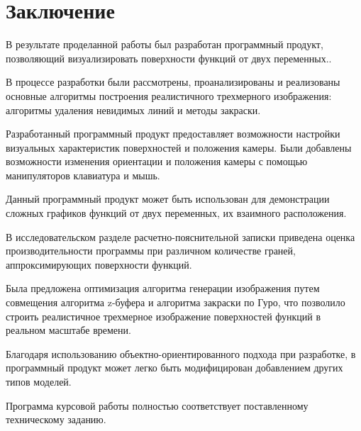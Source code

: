 \chapter*{Заключение}


В результате проделанной работы был разработан программный продукт, позволяющий визуализировать поверхности функций от двух переменных..

В процессе разработки были рассмотрены, проанализированы и реализованы основные алгоритмы построения реалистичного трехмерного изображения: алгоритмы удаления невидимых линий и методы закраски.

Разработанный программный продукт предоставляет возможности настройки визуальных характеристик поверхностей и положения камеры.
Были добавлены возможности изменения ориентации и положения камеры с помощью манипуляторов клавиатура и мышь.

Данный программный продукт может быть использован для демонстрации сложных графиков функций от двух переменных, их взаимного расположения.

В исследовательском разделе расчетно-пояснительной записки приведена оценка производительности программы при различном количестве граней, аппроксимирующих поверхности функций.

Была предложена оптимизация алгоритма генерации изображения путем совмещения алгоритма z-буфера и алгоритма закраски по Гуро, что позволило строить реалистичное трехмерное изображение поверхностей функций в реальном масштабе времени.

Благодаря использованию объектно-ориентированного подхода при разработке, в программный продукт может легко быть модифицирован добавлением других типов моделей.

Программа курсовой работы полностью соответствует поставленному техническому заданию.
